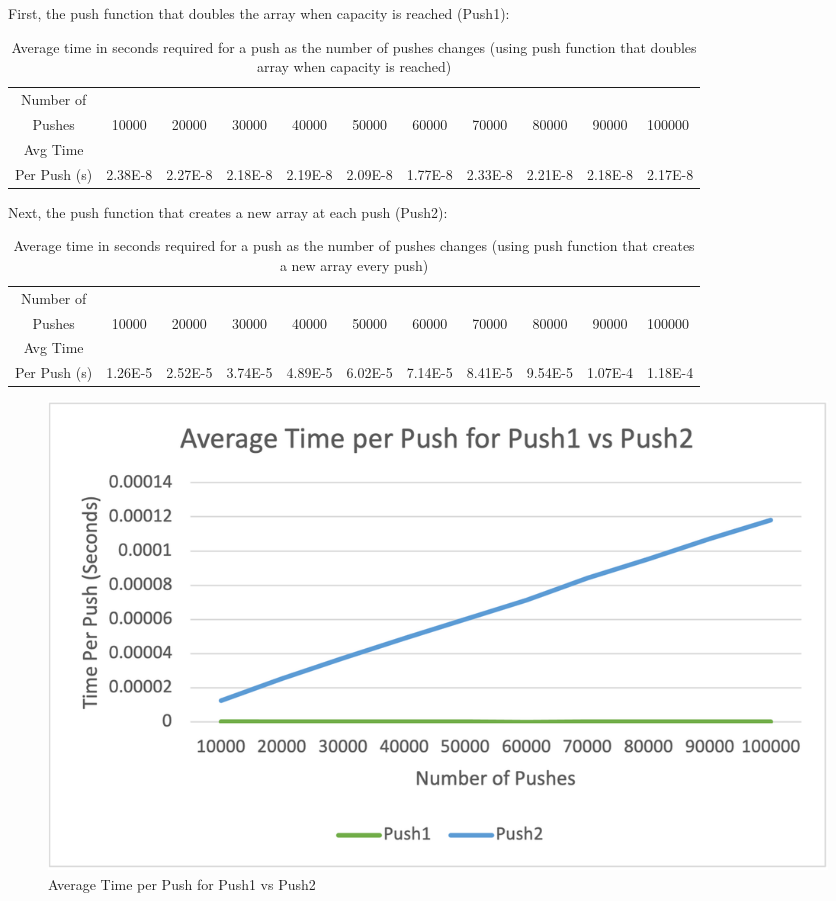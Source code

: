 \documentclass{article}
\begin{document}
First, the push function that doubles the array when capacity is reached (Push1): \\

\begin{table}[h!]
\centering
\begin{tabular}{c|c|c|c|c|c|c|c|c|c|l}
Number of\\Pushes & 10000 & 20000 & 30000 & 40000 & 50000 & 60000 & 70000 & 80000 & 90000 & 100000 \\\hline
Avg Time \\Per Push (s) & 2.38E-8 & 2.27E-8 & 2.18E-8 & 2.19E-8 & 2.09E-8 & 1.77E-8 & 2.33E-8 & 2.21E-8 & 2.18E-8 & 2.17E-8 \\

\end{tabular}
\caption{\label{tab:widgets}Average time in seconds required for a push as the number of pushes changes (using push function that doubles array when capacity is reached)}
\end{table}

\pagebreak

Next, the push function that creates a new array at each push (Push2): 

\begin{table}[h!]
\centering
\begin{tabular}{c|c|c|c|c|c|c|c|c|c|l}
Number of\\Pushes & 10000 & 20000 & 30000 & 40000 & 50000 & 60000 & 70000 & 80000 & 90000 & 100000 \\\hline
Avg Time\\Per Push (s) & 1.26E-5 & 2.52E-5 & 3.74E-5 & 4.89E-5 & 6.02E-5 & 7.14E-5 & 8.41E-5 & 9.54E-5 & 1.07E-4 & 1.18E-4 \\

\end{tabular}
\caption{\label{tab:widgets}Average time in seconds required for a push as the number of pushes changes (using push function that creates a new array every push)}
\end{table}

\begin{figure}[h!]
  \includegraphics[width=\linewidth]{Figure1_0A.png}
  \caption{Average Time per Push for Push1 vs Push2}
  \label{fig:boat1}
\end{figure}
\end{document}
